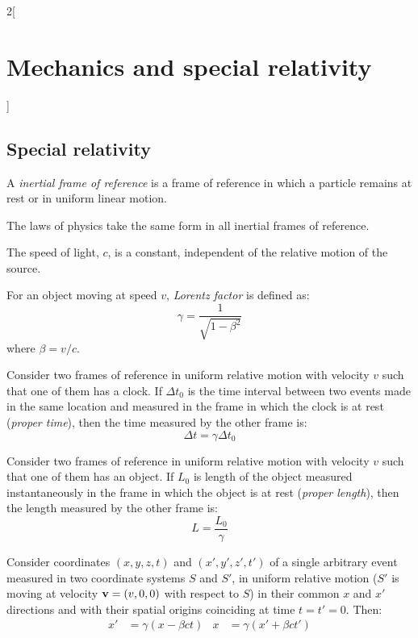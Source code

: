 \documentclass[../../../main.tex]{subfiles}
\begin{document}
\begin{multicols}{2}[\section{Mechanics and special relativity}]
  \subsection{Special relativity}
  \begin{definition}
    A \textit{inertial frame of reference} is a frame of reference in which a particle remains at rest or in uniform linear motion.
  \end{definition}
  \begin{principle}
    The laws of physics take the same form in all inertial frames of reference.
  \end{principle}
  \begin{principle}
    The speed of light, $c$, is a constant, independent of the relative motion of the source.
  \end{principle}
  \begin{definition}
    For an object moving at speed $v$, \textit{Lorentz factor} is defined as:
    $$\gamma=\frac{1}{\sqrt{1-\beta^2}}$$ where $\beta=v/c$.
  \end{definition}
  \begin{prop}
    Consider two frames of reference in uniform relative motion with velocity $v$ such that one of them has a clock. If $\Delta t_0$ is the time interval between two events made in the same location and measured in the frame in which the clock is at rest (\textit{proper time}), then the time measured by the other frame is:
    $$\Delta t=\gamma\Delta t_0$$
  \end{prop}
  \begin{prop}
    Consider two frames of reference in uniform relative motion with velocity $v$ such that one of them has an object. If $L_0$ is length of the object measured instantaneously in the frame in which the object is at rest (\textit{proper length}), then the length measured by the other frame is:
    $$L=\frac{L_0}{\gamma}$$
  \end{prop}
  \begin{prop}
    Consider coordinates $(x,y,z,t)$ and $(x',y',z',t')$ of a single arbitrary event measured in two coordinate systems $S$ and $S'$, in uniform relative motion ($S'$ is moving at velocity $\boldsymbol{\mathrm{v}}=(v,0,0)$ with respect to $S$) in their common $x$ and $x'$ directions and  with their spatial origins coinciding at time $t=t'=0$. Then:
    \begin{align*}
      x'  & =\gamma(x-\beta ct) & x  & =\gamma(x'+\beta ct') \\

\end{align*}
\end{prop}
\end{multicols}
\end{document}
